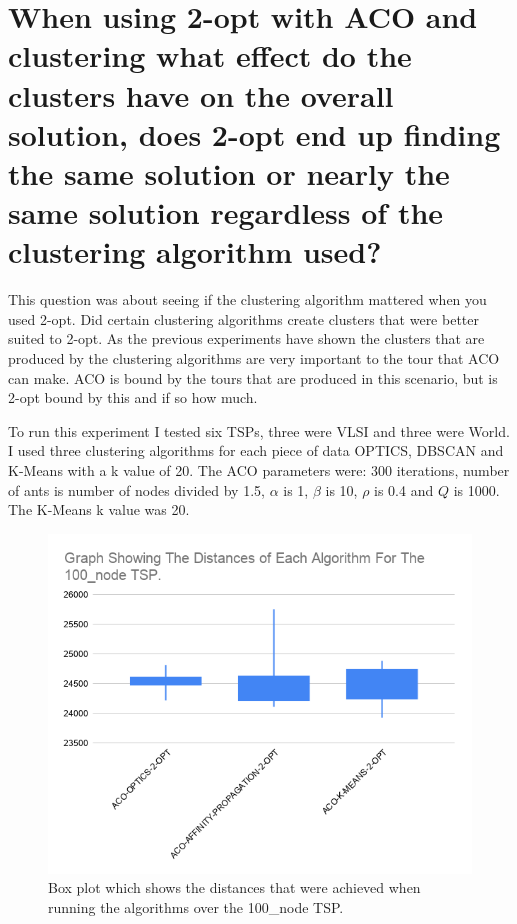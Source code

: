 \section{When using 2-opt with ACO and clustering what effect do the clusters have on the overall solution, does 2-opt end up finding the same solution or nearly the same solution regardless of the clustering algorithm used?}

This question was about seeing if the clustering algorithm mattered when you used 2-opt. Did certain clustering algorithms create clusters that were better suited to 2-opt. As the previous experiments have shown the clusters that are produced by the clustering algorithms are very important to the tour that ACO can make. ACO is bound by the tours that are produced in this scenario, but is 2-opt bound by this and if so how much.

To run this experiment I tested six TSPs, three were VLSI and three were World. I used three clustering algorithms for each piece of data OPTICS, DBSCAN and K-Means with a k value of 20. The ACO parameters were: 300 iterations, number of ants is number of nodes divided by 1.5, $\alpha$ is 1, $\beta$ is 10, $\rho$ is 0.4 and $Q$ is 1000. The K-Means k value was 20.

\begin{figure}
    \centering
    \includegraphics[width=\textwidth]{figures/tsp_distance_100_node_graph.png}
    \caption{Box plot which shows the distances that were achieved when running the algorithms over the 100\_node TSP.}
    \label{fig:tsp_distance_100_node_graph}
\end{figure}

